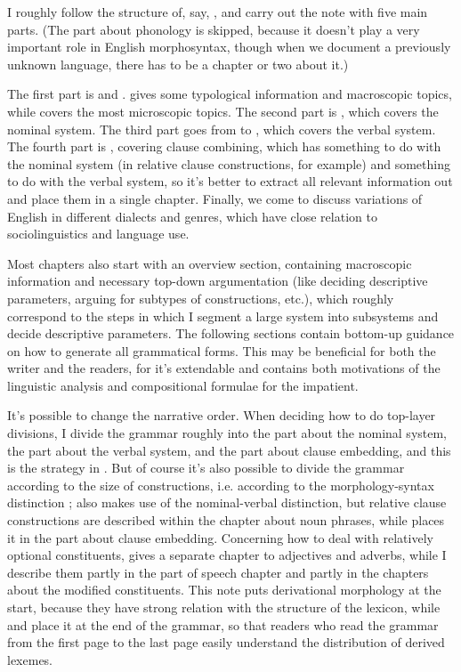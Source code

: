 \documentclass[UTF8, a4paper, oneside, scheme=plain]{ctexrep}
\begin{document}
I roughly follow the structure of, say, \citet{Friesen2017},
and carry out the note with five main parts.
(The part about phonology is skipped,
because it doesn't play a very important role in English morphosyntax,
though when we document a previously unknown language,
there has to be a chapter or two about it.)

The first part is  and .
 gives some typological information and macroscopic topics,
while  covers the most microscopic topics.
The second part is , %
which covers the nominal system.
The third part goes from  to ,
which covers the verbal system.
The fourth part is ,
covering clause combining,
which has something to do with the nominal system 
(in relative clause constructions, for example)
and something to do with the verbal system,
so it's better to extract all relevant information out 
and place them in a single chapter.
Finally, we come to discuss variations of English
in different dialects and genres, 
which have close relation to sociolinguistics and language use.

Most chapters also start with an overview section,
containing macroscopic information and necessary top-down argumentation
(like deciding descriptive parameters,
arguing for subtypes of constructions, etc.),
which roughly correspond to the 
steps in which I segment a large system into subsystems 
and decide descriptive parameters.
The following sections contain bottom-up guidance 
on how to generate all grammatical forms.
This may be beneficial for both the writer and the readers,
for it's extendable
and contains both motivations of the linguistic analysis 
and compositional formulae for the impatient.

It's possible to change the narrative order.
When deciding how to do top-layer divisions,
I divide the grammar roughly into 
the part about the nominal system, 
the part about the verbal system,
and the part about clause embedding,
and this is the strategy in \citet{jacques2021grammar}.
But of course it's also possible to 
divide the grammar according to the size of constructions, 
i.e. according to the morphology-syntax distinction
\citep{greenough2013allen,forker2020grammar};
\citet{maurer2021grammar} also makes use of the nominal-verbal distinction,
but relative clause constructions are described within the chapter about noun phrases,
while \citet{jacques2021grammar} places it in the part about clause embedding.
Concerning how to deal with relatively optional constituents,
\citet{cgel} gives a separate chapter to adjectives and adverbs,
while I describe them partly in the part of speech chapter 
and partly in the chapters about the modified constituents.
This note puts derivational morphology at the start,
because they have strong relation with the structure of the lexicon,
while \citet{cgel} and \citet{maurer2021grammar} place it at the end of the grammar,
so that readers who read the grammar from the first page to the last page 
easily understand the distribution of derived lexemes.
\end{document}
